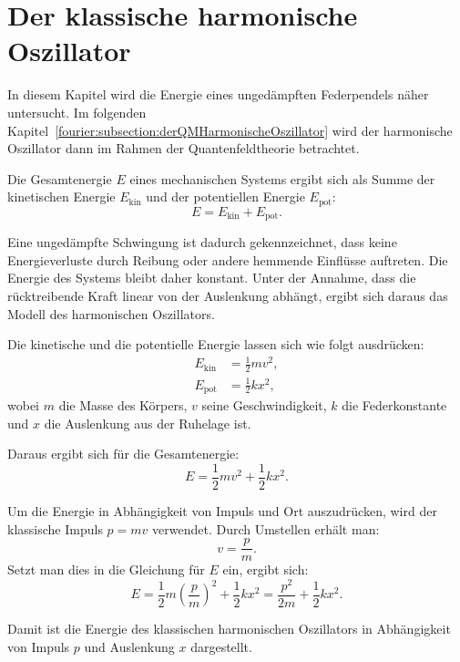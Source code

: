 %
%
%
%

\section{Der klassische harmonische Oszillator\label{fourier:section:derKlassischeHarmonischeOszillator}}

In diesem Kapitel wird die Energie eines ungedämpften Federpendels näher untersucht.  
Im folgenden Kapitel~\ref{fourier:subsection:derQMHarmonischeOszillator} wird der harmonische Oszillator dann im Rahmen der Quantenfeldtheorie betrachtet.

Die Gesamtenergie \( E \) eines mechanischen Systems ergibt sich als Summe der kinetischen Energie \( E_{\text{kin}} \) und der potentiellen Energie \( E_{\text{pot}} \):  
\begin{equation}  
	E = E_{\text{kin}} + E_{\text{pot}}.  
\end{equation}

Eine ungedämpfte Schwingung ist dadurch gekennzeichnet, dass keine Energieverluste durch Reibung oder andere hemmende Einflüsse auftreten.  
Die Energie des Systems bleibt daher konstant.  
Unter der Annahme, dass die rücktreibende Kraft linear von der Auslenkung abhängt, ergibt sich daraus das Modell des harmonischen Oszillators.

Die kinetische und die potentielle Energie lassen sich wie folgt ausdrücken:  
\begin{align}  
	E_{\text{kin}} &= \frac{1}{2} m v^2, \\  
	E_{\text{pot}} &= \frac{1}{2} k x^2,  
\end{align}  
wobei \( m \) die Masse des Körpers, \( v \) seine Geschwindigkeit, \( k \) die Federkonstante und \( x \) die Auslenkung aus der Ruhelage ist.

Daraus ergibt sich für die Gesamtenergie:  
\begin{equation}  
	E = \frac{1}{2} m v^2 + \frac{1}{2} k x^2.  
\end{equation}

Um die Energie in Abhängigkeit von Impuls und Ort auszudrücken, wird der klassische Impuls \( p = m v \) verwendet.  
Durch Umstellen erhält man:  
\[
	v = \frac{p}{m}.  
\]  
Setzt man dies in die Gleichung für \( E \) ein, ergibt sich:  
\begin{equation}  
	E = \frac{1}{2} m {\left(\frac{p}{m}\right)}^{2} + \frac{1}{2} k x^{2} = \frac{p^{2}}{2m} + \frac{1}{2} k x^{2}.
\end{equation}

Damit ist die Energie des klassischen harmonischen Oszillators in Abhängigkeit von Impuls \( p \) und Auslenkung \( x \) dargestellt.

